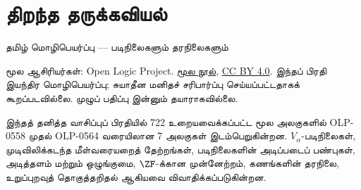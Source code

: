 \documentclass[11pt,a4paper,openany]{memoir}
\begin{document}
\let\Olref\olref
\raggedright
\pagestyle{plain}
\chapter*{திறந்த தருக்கவியல்}
\noindent தமிழ் மொழிபெயர்ப்பு — படிநிலைகளும் தரநிலைகளும்

\noindent மூல ஆசிரியர்கள்: Open Logic Project.
\href{https://github.com/OpenLogicProject/OpenLogic}{மூல நூல்},
\href{https://creativecommons.org/licenses/by/4.0/}{CC BY 4.0}.
இந்தப் பிரதி இயந்திர மொழிபெயர்ப்பு; சுயாதீன மனிதச் சரிபார்ப்பு செய்யப்பட்டதாகக்
கூறப்படவில்லை. முழுப் பதிப்பு இன்னும் தயாராகவில்லை.

\noindent இந்தத் தனித்த வாசிப்புப் பிரதியில் 722 உறையவைக்கப்பட்ட மூல
அலகுகளில் OLP-0558 முதல் OLP-0564 வரையிலான 7 அலகுகள் இடம்பெறுகின்றன.
$V_\alpha$-படிநிலைகள், முடிவிலிக்கடந்த மீள்வரையறைத் தேற்றங்கள்,
படிநிலைகளின் அடிப்படைப் பண்புகள், அடித்தளம் மற்றும் ஒழுங்குமை,
$\ZF$-க்கான முன்னேற்றம், கணங்களின் தரநிலை, உறுப்புறவுத் தொகுத்தறிதல்
ஆகியவை விவாதிக்கப்படுகின்றன.

\clearpage
\tableofcontents*



\end{document}
